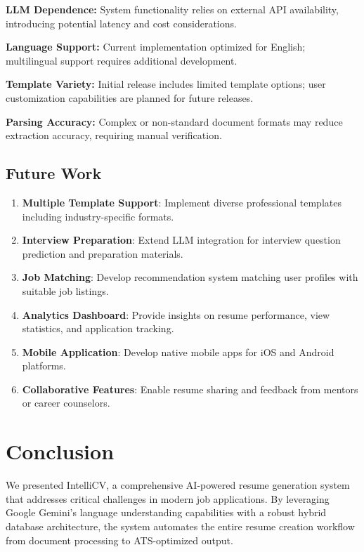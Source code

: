 \documentclass[conference]{IEEEtran}
\begin{document}
\textbf{LLM Dependence:} System functionality relies on external API availability, introducing potential latency and cost considerations.

\textbf{Language Support:} Current implementation optimized for English; multilingual support requires additional development.

\textbf{Template Variety:} Initial release includes limited template options; user customization capabilities are planned for future releases.

\textbf{Parsing Accuracy:} Complex or non-standard document formats may reduce extraction accuracy, requiring manual verification.

\subsection{Future Work}

\begin{enumerate}
    \item \textbf{Multiple Template Support}: Implement diverse professional templates including industry-specific formats.
    \item \textbf{Interview Preparation}: Extend LLM integration for interview question prediction and preparation materials.
    \item \textbf{Job Matching}: Develop recommendation system matching user profiles with suitable job listings.
    \item \textbf{Analytics Dashboard}: Provide insights on resume performance, view statistics, and application tracking.
    \item \textbf{Mobile Application}: Develop native mobile apps for iOS and Android platforms.
    \item \textbf{Collaborative Features}: Enable resume sharing and feedback from mentors or career counselors.
\end{enumerate}

\section{Conclusion}

We presented IntelliCV, a comprehensive AI-powered resume generation system that addresses critical challenges in modern job applications. By leveraging Google Gemini's language understanding capabilities with a robust hybrid database architecture, the system automates the entire resume creation workflow from document processing to ATS-optimized output.
\end{document}
